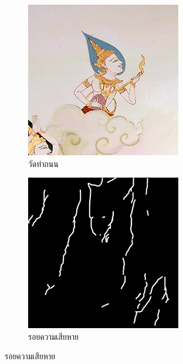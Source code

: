 \documentclass[hidelinks, a4paper,12pt]{article}
\numberwithin{equation}{section}							%
\numberwithin{equation}{section}
\begin{document}
{\begin{figure}[H]
			\bigskip
	
	
		\begin{subfigure}{0.4\linewidth}
			\centering
			\includegraphics[width=0.8\linewidth]{images/thaiart/case05-original.png}
			\caption{วัดท่าถนน}
			\label{image:thaiart_case05_original}			
		\end{subfigure}
		\begin{subfigure}{0.4\linewidth}
			\centering
			\includegraphics[width=0.8\linewidth]{images/thaiart/inpaint-domain.png}
			\caption{รอยความเสียหาย}
		\end{subfigure}
	\end{figure}
}
\end{document}
